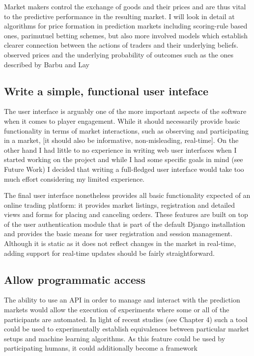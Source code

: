 \documentclass[bsc,frontabs,twoside,singlespacing,parskip,deptreport]{infthesis}     %
\begin{document}
Market makers control the exchange of goods and their prices and are thus vital to the predictive performance in the resulting market. I will look in detail at algorithms for price formation in prediction markets including scoring-rule based ones, parimutuel betting schemes, but also more involved models which establish clearer connection between the actions of traders and their underlying beliefs. observed prices and the underlying probability of outcomes such as the ones described by Barbu and Lay 

\subsection{Write a simple, functional user inteface}
	The user interface is arguably one of the more important aspects of the software when it comes to player engagement. While it should necessarily provide basic functionality in terms of market interactions, such as observing and participating in a market, [it should also be informative, non-misleading, real-time]. On the other hand I had little to no experience in writing web user interfaces when I started working on the project and while I had some specific goals in mind (see Future Work) I decided that writing a full-fledged user interface would take too much effort considering my limited experience. 
	
	The final user interface nonetheless provides all basic functionality expected of an online trading platform: it provides market listings, registration and detailed views and forms for placing and canceling orders. These features are built on top of the user authentication module that is part of the default Django installation and provides the basic means for user registration and session management. Although it is static as it does not reflect changes in the market in real-time, adding support for real-time updates should be fairly straightforward. 
	

\subsection{Allow programmatic access}
	The ability to use an API in order to manage and interact with the prediction markets would allow the execution of experiments where some or all of the participants are automated. In light of recent studies (see Chapter 4) such a tool could be used to experimentally establish equivalences between particular market setups and machine learning algorithms. As this feature could be used by participating humans, it could additionally become a framework 
\end{document}
